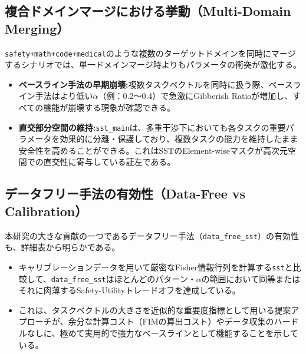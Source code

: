 \documentclass{article}
\begin{document}
\subsection{複合ドメインマージにおける挙動（Multi-Domain Merging）}
\texttt{safety+math+code+medical}のような複数のターゲットドメインを同時にマージするシナリオでは、単一ドメインマージ時よりもパラメータの衝突が激化する。
\begin{itemize}
    \item \textbf{ベースライン手法の早期崩壊:}複数タスクベクトルを同時に扱う際、ベースライン手法はより低い$\alpha$（例：0.2〜0.4）で急激にGibberish Ratioが増加し、すべての機能が崩壊する現象が確認できる。
    \item \textbf{直交部分空間の維持:}\texttt{sst\_main}は、多重干渉下においても各タスクの重要パラメータを効果的に分離・保護しており、複数タスクの能力を維持したまま安全性を高めることができる。これはSSTのElement-wiseマスクが高次元空間での直交性に寄与している証左である。
\end{itemize}

\subsection{データフリー手法の有効性（Data-Free vs Calibration）}
本研究の大きな貢献の一つであるデータフリー手法（\texttt{data\_free\_sst}）の有効性も、詳細表から明らかである。
\begin{itemize}
    \item キャリブレーションデータを用いて厳密なFisher情報行列を計算する\texttt{sst}と比較して、\texttt{data\_free\_sst}はほとんどのパターン・$\alpha$の範囲において同等またはそれに肉薄するSafety-Utilityトレードオフを達成している。
    \item これは、タスクベクトルの大きさを近似的な重要度指標として用いる提案アプローチが、余分な計算コスト（FIMの算出コスト）やデータ収集のハードルなしに、極めて実用的で強力なベースラインとして機能することを示している。
\end{itemize}

\newpage

\end{document}

